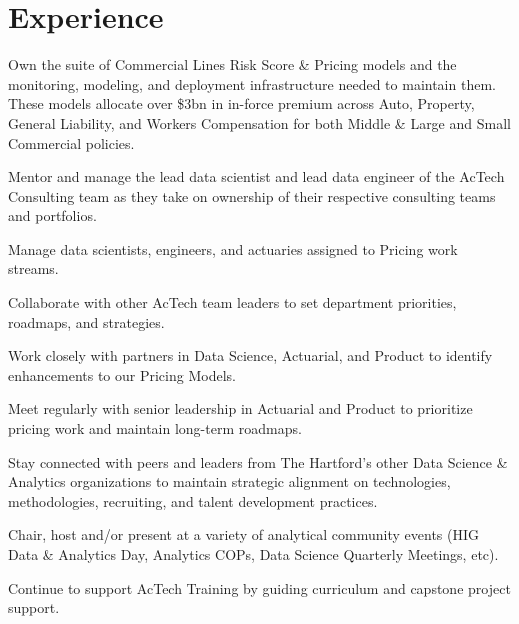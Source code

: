 \documentclass[letterpaper]{deedy-resume} %
\begin{document}
\begin{minipage}[t]{0.68\textwidth}
  \section{Experience}
  \hfill{}
  \hfill
  \vspace{\topsep}
  \begin{tightitemize}
  \item Own the suite of Commercial Lines Risk Score \& Pricing models
    and the monitoring, modeling, and deployment infrastructure needed
    to maintain them. These models allocate over \$3bn in in-force
    premium across Auto, Property, General Liability, and
    Workers Compensation for both Middle \& Large and Small Commercial
    policies.
  \item  Mentor and manage the lead data scientist and lead data
    engineer of the AcTech Consulting team as they take on ownership
    of their respective consulting teams and portfolios.
  \item Manage data scientists, engineers, and actuaries assigned to Pricing work
    streams.
  \item Collaborate with other AcTech team leaders to set department
    priorities, roadmaps, and strategies. 
  \item Work closely with partners in Data Science, Actuarial, and
    Product to identify enhancements to our Pricing Models.
  \item Meet regularly with senior leadership in Actuarial and Product
    to prioritize pricing work and maintain long-term roadmaps.
  \item Stay connected with peers and leaders from The Hartford's other
    Data Science \& Analytics organizations to maintain strategic
    alignment on technologies, methodologies, recruiting, and talent
    development practices.
  \item Chair, host and/or present at a variety of analytical community events
    (HIG Data \& Analytics Day, Analytics COPs, Data Science Quarterly
    Meetings, etc).
  \item Continue to support AcTech Training by guiding curriculum and
    capstone project support.
  \end{tightitemize}
  \sectionspace


\end{minipage}
\end{document}
